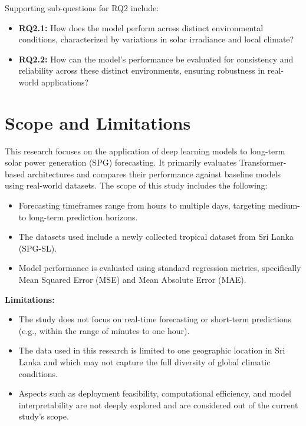 \documentclass[12pt]{uomthesis}
\begin{document}
Supporting sub-questions for RQ2 include:

\begin{itemize}
    \item \textbf{RQ2.1:} How does the model perform across distinct environmental conditions, characterized by variations in solar irradiance and local climate?
    \item \textbf{RQ2.2:} How can the model's performance be evaluated for consistency and reliability across these distinct environments, ensuring robustness in real-world applications?
\end{itemize}

\section{Scope and Limitations}
\label{sec:scope-limitations}

This research focuses on the application of deep learning models to long-term solar power generation (SPG) forecasting. It primarily evaluates Transformer-based architectures and compares their performance against baseline models using real-world datasets. The scope of this study includes the following:

\begin{itemize}
    \item Forecasting timeframes range from hours to multiple days, targeting medium- to long-term prediction horizons.
    \item The datasets used include a newly collected tropical dataset from Sri Lanka (SPG-SL).
    \item Model performance is evaluated using standard regression metrics, specifically Mean Squared Error (MSE) and Mean Absolute Error (MAE).
\end{itemize}

\textbf{Limitations:}

\begin{itemize}
    \item The study does not focus on real-time forecasting or short-term predictions (e.g., within the range of minutes to one hour).
    \item The data used in this research is limited to one geographic location in Sri Lanka and which may not capture the full diversity of global climatic conditions.
    \item Aspects such as deployment feasibility, computational efficiency, and model interpretability are not deeply explored and are considered out of the current study’s scope.
\end{itemize}
\end{document}

